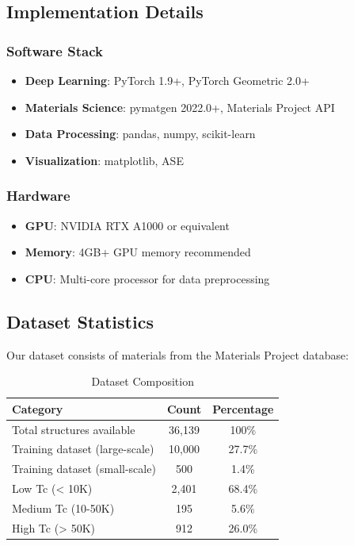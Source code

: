 \documentclass[11pt,a4paper]{article}
\begin{document}
\subsection{Implementation Details}

\subsubsection{Software Stack}

\begin{itemize}
    \item \textbf{Deep Learning}: PyTorch 1.9+, PyTorch Geometric 2.0+
    \item \textbf{Materials Science}: pymatgen 2022.0+, Materials Project API
    \item \textbf{Data Processing}: pandas, numpy, scikit-learn
    \item \textbf{Visualization}: matplotlib, ASE
\end{itemize}

\subsubsection{Hardware}

\begin{itemize}
    \item \textbf{GPU}: NVIDIA RTX A1000 or equivalent
    \item \textbf{Memory}: 4GB+ GPU memory recommended
    \item \textbf{CPU}: Multi-core processor for data preprocessing
\end{itemize}

\subsection{Dataset Statistics}

Our dataset consists of materials from the Materials Project database:

\begin{table}[H]
\centering
\caption{Dataset Composition}
\begin{tabular}{@{}lcc@{}}
\toprule
\textbf{Category} & \textbf{Count} & \textbf{Percentage} \\
\midrule
Total structures available & 36,139 & 100\% \\
Training dataset (large-scale) & 10,000 & 27.7\% \\
Training dataset (small-scale) & 500 & 1.4\% \\
Low Tc (< 10K) & 2,401 & 68.4\% \\
Medium Tc (10-50K) & 195 & 5.6\% \\
High Tc (> 50K) & 912 & 26.0\% \\
\bottomrule
\end{tabular}
\end{table}
\end{document}
